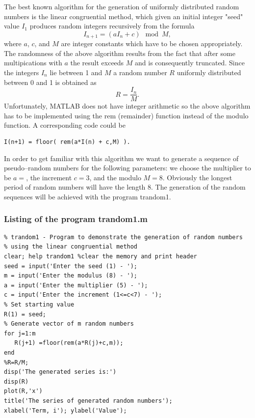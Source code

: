 The best known algorithm for the generation of uniformly 
distributed random numbers is the linear congruential method, 
which given an initial integer "seed" value $I_1$ produces random 
integers recursively from the formula
\begin{equation*}
I_{n+1} = (aI_n +c) \mod M,
\end{equation*}
where $a$, $c$, and $M$ are integer constants which have to be 
chosen appropriately. 
The randomness of the above algorithm results from the fact that 
after some multipications with $a$ the result exceeds $M$ and is 
consequently truncated. Since the integers $I_n$ lie between 1 and 
$M$ a random number $R$ uniformly distributed 
between 0 and 1 is obtained as
\begin{equation*}
R = \frac{I_n}{M}.
\end{equation*}
Unfortunately, MATLAB does not have integer arithmetic so the above algorithm 
has to be implemented using the {\sf rem} (remainder) function 
instead of the modulo function. A corresponding code could be
\begin{verbatim}
I(n+1) = floor( rem(a*I(n) + c,M) ).
\end{verbatim}
In order to get familiar with this algorithm we want to generate a 
sequence of pseudo--random numbers for the following parameters:
we choose the multiplier to be $a=$, the increment $c=3$, and the 
modulo $M=8$. Obviously the longest period of random numbers will
have the length 8. The generation of the random sequences will
be achieved with the program {\sf trandom1}.

\subsubsection{Listing of the program trandom1.m}
\begin{verbatim}
% trandom1 - Program to demonstrate the generation of random numbers
% using the linear congruential method
clear; help trandom1 %clear the memory and print header
seed = input('Enter the seed (1) - ');
m = input('Enter the modulus (8) - ');
a = input('Enter the multiplier (5) - ');
c = input('Enter the increment (1<=c<7) - ');
% Set starting value
R(1) = seed;
% Generate vector of m random numbers
for j=1:m
   R(j+1) =floor(rem(a*R(j)+c,m));
end
%R=R/M;
disp('The generated series is:')
disp(R)
plot(R,'x')
title('The series of generated random numbers');
xlabel('Term, i'); ylabel('Value');
\end{verbatim}

